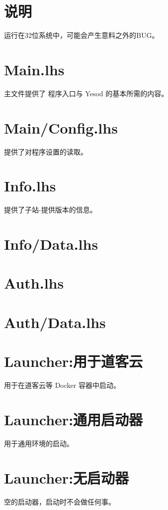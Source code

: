 










  \maketitle
  \newpage
  \tableofcontents
  \newpage

  \section{说明}
  运行在32位系统中，可能会产生意料之外的BUG。

  \section[程序主文件 Main.lhs文件]{Main.lhs}
  主文件提供了 程序入口与 Yesod 的基本所需的内容。
  

  \section[设置载入文件 Main/Config.lhs文件]{Main/Config.lhs}
  提供了对程序设置的读取。
  

  \section[子站-提供版本信息 Info.lhs文件]{Info.lhs}
  提供了子站-提供版本的信息。
  

  \section[辅助Info.lhs文件]{Info/Data.lhs}
  

  \section[认证]{Auth.lhs}
  

  \section[辅助Auth.lhs]{Auth/Data.lhs}
  

  \section{Launcher:用于道客云}
  用于在道客云等 Docker 容器中启动。
  
  \section{Launcher:通用启动器}
  用于通用环境的启动。
  
  \section{Launcher:无启动器}
  空的启动器，启动时不会做任何事。
  





